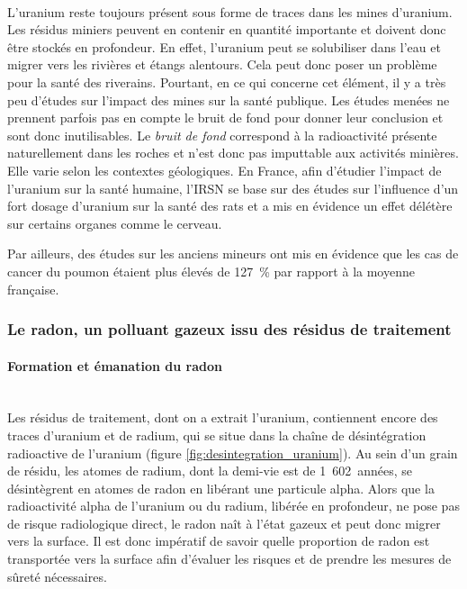 \documentclass{article}
\begin{document}
\paragraph{} L'uranium reste toujours présent sous forme de traces dans les mines d'uranium. Les résidus miniers peuvent en contenir en quantité importante et doivent donc être stockés en profondeur. En effet, l'uranium peut se solubiliser dans l'eau et migrer vers les rivières et étangs alentours. Cela peut donc poser un problème pour la santé des riverains. Pourtant, en ce qui concerne cet élément, il y a très peu d'études sur l’impact des mines sur la santé publique. Les études menées ne prennent parfois pas en compte le bruit de fond pour donner leur conclusion et sont donc inutilisables. Le \emph{bruit de fond} correspond à la radioactivité présente naturellement dans les roches et n'est donc pas imputtable aux activités minières. Elle varie selon les contextes géologiques. En France, afin d’étudier l’impact de l’uranium sur la santé humaine, l’IRSN se base sur des études sur l’influence d’un fort dosage d’uranium sur la santé des rats et a mis en évidence un effet délétère sur certains organes comme le cerveau.

Par ailleurs, des études sur les anciens mineurs ont mis en évidence que les cas de cancer du poumon étaient plus élevés de 127~\% par rapport à la moyenne française.


\subsubsection{Le radon, un polluant gazeux issu des résidus de traitement}

\paragraph{Formation et émanation du radon \\ \\} Les résidus de traitement, dont on a extrait l’uranium, contiennent encore des traces d’uranium et de radium, qui se situe dans la chaîne de désintégration radioactive de l’uranium (figure \ref{fig:desintegration_uranium}). Au sein d’un grain de résidu, les atomes de radium, dont la demi-vie est de 1~602~années, se désintègrent en atomes de radon en libérant une particule alpha. Alors que la radioactivité alpha de l’uranium ou du radium, libérée en profondeur, ne pose pas de risque radiologique direct, le radon naît à l’état gazeux et peut donc migrer vers la surface. Il est donc impératif de savoir quelle proportion de radon est transportée vers la surface afin d'évaluer les risques et de prendre les mesures de sûreté nécessaires.
\end{document}
